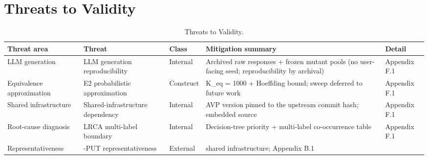 \documentclass[manuscript,screen,review]{acmart}
\begin{document}

\section{Threats to Validity}\label{threats-to-validity}

{%
\begin{longtable}[]{@{}
  >{\raggedright\arraybackslash}p{}
  >{\raggedright\arraybackslash}p{}
  >{\raggedright\arraybackslash}p{}
  >{\raggedright\arraybackslash}p{}
  >{\raggedright\arraybackslash}p{}@{}}
\caption{Threats to Validity.}\label{tab:p2-14}\\
\toprule\noalign{}
\begin{minipage}[b]{\linewidth}\raggedright
Threat area
\end{minipage} & \begin{minipage}[b]{\linewidth}\raggedright
Threat
\end{minipage} & \begin{minipage}[b]{\linewidth}\raggedright
Class
\end{minipage} & \begin{minipage}[b]{\linewidth}\raggedright
Mitigation summary
\end{minipage} & \begin{minipage}[b]{\linewidth}\raggedright
Detail
\end{minipage} \\
\midrule\noalign{}
\endfirsthead
\endhead
\bottomrule\noalign{}
\endlastfoot
LLM generation & LLM generation reproducibility & Internal & Archived raw responses
+ frozen mutant pools (no user-facing seed; reproducibility by archival) & Appendix F.1 \\
Equivalence approximation & E2 probabilistic approximation & Construct & K\_eq = 1000 +
Hoeffding bound; sweep deferred to future work & Appendix F.1 \\
Shared infrastructure & Shared-infrastructure dependency & Internal & AVP version pinned to the upstream
commit hash; embedded source & Appendix F.1 \\
Root-cause diagnosis & LRCA multi-label boundary & Internal & Decision-tree priority +
multi-label co-occurrence table & Appendix F.1 \\
Representativeness & 12-PUT representativeness & External & shared infrastructure; Appendix B.1

\end{longtable}}
\end{document}
